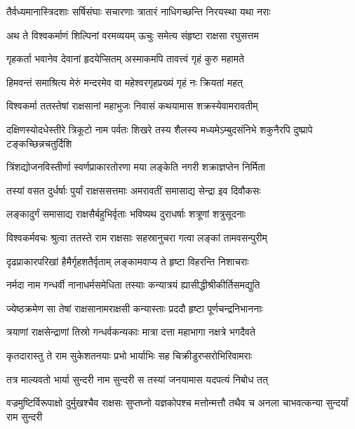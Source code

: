 \twolineshloka
{तैर्वध्यमानास्त्रिदशाः सर्षिसंघाः सचारणाः}
{त्रातारं नाधिगच्छन्ति निरयस्था यथा नराः} %

\twolineshloka
{अथ ते विश्वकर्माणं शिल्पिनां वरमव्ययम्}
{ऊचुः समेत्य संहृष्टा राक्षसा रघुसत्तम} %

\twolineshloka
{गृहकर्ता भवानेव देवानां हृदयेप्सितम्}
{अस्माकमपि तावत्त्वं गृहं कुरु महामते} %

\twolineshloka
{हिमवन्तं समाश्रित्य मेरुं मन्दरमेव वा}
{महेश्वरगृहप्रख्यं गृहं नः क्रियतां महत्} %

\twolineshloka
{विश्वकर्मा ततस्तेषां राक्षसानां महाभुजः}
{निवासं कथयामास शक्रस्येवामरावतीम्} %

\threelineshloka
{दक्षिणस्योदधेस्तीरे त्रिकूटो नाम पर्वतः}
{शिखरे तस्य शैलस्य मध्यमेऽम्बुदसंनिभे}
{शकुनैरपि दुष्प्रापे टङ्कच्छिन्नचतुर्दिशि} %

\twolineshloka
{त्रिंशद्योजनविस्तीर्णा स्वर्णप्राकारतोरणा}
{मया लङ्केति नगरी शक्राज्ञप्तेन निर्मिता} %

\twolineshloka
{तस्यां वसत दुर्धर्षाः पुर्यां राक्षससत्तमाः}
{अमरावतीं समासाद्य सेन्द्रा इव दिवौकसः} %

\twolineshloka
{लङ्कादुर्गं समासाद्य राक्षसैर्बहुभिर्वृताः}
{भविष्यथ दुराधर्षाः शत्रूणां शत्रुसूदनाः} %

\twolineshloka
{विश्वकर्मवचः श्रुत्वा ततस्ते राम राक्षसाः}
{सहस्रानुचरा गत्वा लङ्कां तामवसन्पुरीम्} %

\twolineshloka
{दृढप्राकारपरिखां हैमैर्गृहशतैर्वृताम्}
{लङ्कामवाप्य ते हृष्टा विहरन्ति निशाचराः} %

\twolineshloka
{नर्मदा नाम गन्धर्वी नानाधर्मसमेधिता}
{तस्याः कन्यात्रयं ह्यासीद्धीश्रीकीर्तिसमद्युति} %

\twolineshloka
{ज्येष्ठक्रमेण सा तेषां राक्षसानामराक्षसी}
{कन्यास्ताः प्रददौ हृष्टा पूर्णचन्द्रनिभाननाः} %

\twolineshloka
{त्रयाणां राक्षसेन्द्राणां तिस्रो गन्धर्वकन्यकाः}
{मात्रा दत्ता महाभागा नक्षत्रे भगदैवते} %

\twolineshloka
{कृतदारास्तु ते राम सुकेशतनयाः प्रभो}
{भार्याभिः सह चिक्रीडुरप्सरोभिरिवामराः} %

\twolineshloka
{तत्र माल्यवतो भार्या सुन्दरी नाम सुन्दरी}
{स तस्यां जनयामास यदपत्यं निबोध तत्} %

\threelineshloka
{वज्रमुष्टिर्विरूपाक्षो दुर्मुखश्चैव राक्षसः}
{सुप्तघ्नो यज्ञकोपश्च मत्तोन्मत्तौ तथैव च}
{अनला चाभवत्कन्या सुन्दर्यां राम सुन्दरी} %


